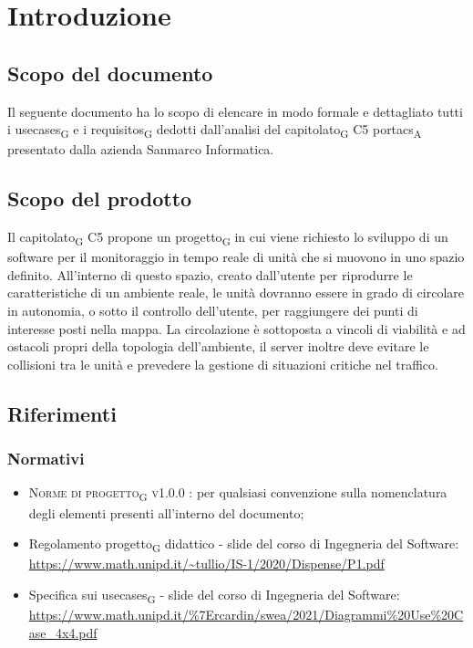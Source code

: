 \section{Introduzione}
\subsection{Scopo del documento}
Il seguente documento ha lo scopo di elencare in modo formale e dettagliato tutti i \glspl{usecase}\textsubscript{G} e i \glspl{requisito}\textsubscript{G} dedotti dall'analisi del \gls{capitolato}\textsubscript{G} C5 \acrshort{portacs}\textsubscript{A} presentato dalla azienda Sanmarco Informatica.

\subsection{Scopo del prodotto}
Il \gls{capitolato}\textsubscript{G} C5 propone un \gls{progetto}\textsubscript{G} in cui viene richiesto lo sviluppo di un software per il monitoraggio in tempo reale di unità che si muovono in uno spazio definito. All'interno di questo spazio, creato dall'utente per riprodurre le caratteristiche di un ambiente reale, le unità dovranno essere in grado di circolare in autonomia, o sotto il controllo dell'utente, per raggiungere dei punti di interesse posti nella mappa. La circolazione è sottoposta a vincoli di viabilità e ad ostacoli propri della topologia dell'ambiente, il server inoltre deve evitare le collisioni tra le unità e prevedere la gestione di situazioni critiche nel traffico.

\subsection{Riferimenti}
\subsubsection{Normativi}
\begin{itemize}
\item \textsc{Norme di \gls{progetto}\textsubscript{G} v1.0.0 }: per qualsiasi convenzione sulla nomenclatura degli elementi presenti all'interno del documento;
\item Regolamento \gls{progetto}\textsubscript{G} didattico - slide del corso di Ingegneria del Software: \\ \url{https://www.math.unipd.it/~tullio/IS-1/2020/Dispense/P1.pdf}
\item Specifica sui \glspl{usecase}\textsubscript{G} - slide del corso di Ingegneria del Software: \\ \url{https://www.math.unipd.it/\%7Ercardin/swea/2021/Diagrammi\%20Use\%20Case_4x4.pdf}
\end{itemize}
